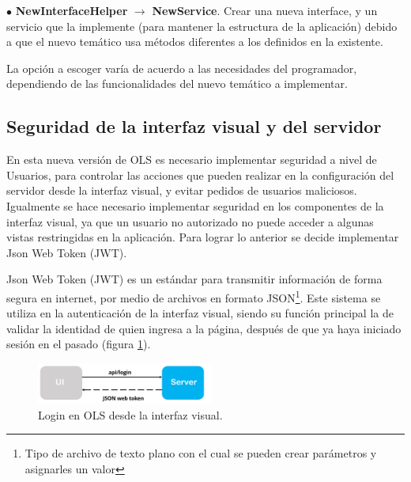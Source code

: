 $\bullet$ \textbf{NewInterfaceHelper} $\rightarrow$ \textbf{NewService}. Crear una nueva interface, y un servicio que la implemente (para mantener la estructura de la aplicaci\'on) debido a que el nuevo tem\'atico usa m\'etodos diferentes a los definidos en la existente.

La opci\'on a escoger var\'ia de acuerdo a las necesidades del programador, dependiendo de las funcionalidades del nuevo tem\'atico a implementar.



\subsection{Seguridad de la interfaz visual y del servidor}
En esta nueva versi\'on de OLS es necesario implementar seguridad a nivel de Usuarios, para controlar las acciones que pueden realizar en la configuraci\'on del servidor desde la interfaz visual, y evitar pedidos de usuarios maliciosos. Igualmente se hace necesario implementar seguridad en los componentes de la interfaz visual, ya que un usuario no autorizado no puede acceder a algunas vistas restringidas en la aplicaci\'on. Para lograr lo anterior se decide implementar Json Web Token (JWT).

Json Web Token (JWT) es un est\'andar para transmitir informaci\'on de forma segura en internet, por medio de archivos en formato JSON\footnote{Tipo de archivo de texto plano con el cual se pueden crear par\'ametros y asignarles un valor}. Este sistema se utiliza en la autenticaci\'on de la interfaz visual, siendo su funci\'on principal la de validar la identidad de quien ingresa a la p\'agina, despu\'es de que ya haya iniciado sesi\'on en el pasado (figura \ref{login}). 

\begin{figure}
\vspace{-20pt}
\begin{center}
\includegraphics[width=0.52\textwidth]{images/login.png} 
\end{center} \vspace{-20pt} \caption{Login en OLS desde la interfaz visual.}  \label{login} \vspace{-10pt} 
\end{figure}

